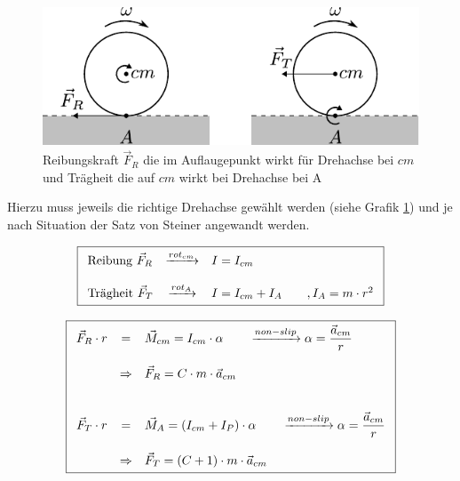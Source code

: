 \begin{figure}[h!]
	\centering
	\includegraphics[scale=0.8]{non-slip-kraft.pdf}
	\caption{Reibungskraft $\vec{F}_R$ die im Auflaugepunkt 
		wirkt für Drehachse bei $cm$ und 
		Trägheit die auf $cm$ wirkt bei Drehachse bei A}
	\label{fig:non-slip-kraft}
\end{figure}

\noindent
Hierzu muss jeweils die richtige Drehachse gewählt werden (siehe
Grafik \ref{fig:non-slip-kraft}) und je nach Situation der Satz von
Steiner angewandt werden.

\[ \boxed{\begin{array}{l c l}
	\text{Reibung } \vec{F}_R 
		& \xrightarrow{rot_{cm}}
		& I = I_{cm} \\
	 & & \\
	\text{Trägheit } \vec{F}_T 
		& \xrightarrow{rot_A}
		& I = I_{cm} + I_A \qquad,I_A = m \cdot r^2
\end{array}}\]

\[ \boxed{\begin{array}{c c l}
	\vec{F}_R \cdot r 
		& =
		& \vec{M}_{cm} = I_{cm} \cdot \alpha 
		\qquad \xrightarrow{non-slip} 
			\displaystyle
			\alpha = \frac{\vec{a}_{cm}}{r} \\
	& & \\
		& \Rightarrow 
		& \vec{F}_R = C \cdot m \cdot \vec{a}_{cm} \\
	& & \\
	& & \\
	\vec{F}_T \cdot r 
		& = 
		& \vec{M}_{A} = (I_{cm} + I_P) \cdot \alpha
		\qquad \xrightarrow{non-slip}
			\displaystyle
			\alpha = \frac{\vec{a}_{cm}}{r} \\
	& & \\
		& \Rightarrow 
		& \vec{F}_T = (C + 1) \cdot m \cdot \vec{a}_{cm}
\end{array} } \]


